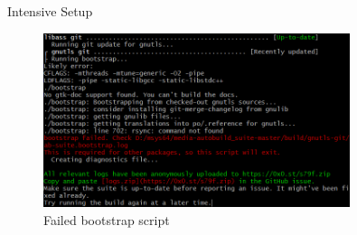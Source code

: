 \documentclass{beamer}
\begin{document}
\begin{frame}{}
  \begin{center}
    \Large Intensive Setup
  \end{center}
  \begin{figure}
    \includegraphics[width=0.8\textwidth]{img/terminal.png}
    \caption{Failed bootstrap script}
  \end{figure}
\end{frame}



\end{document}
